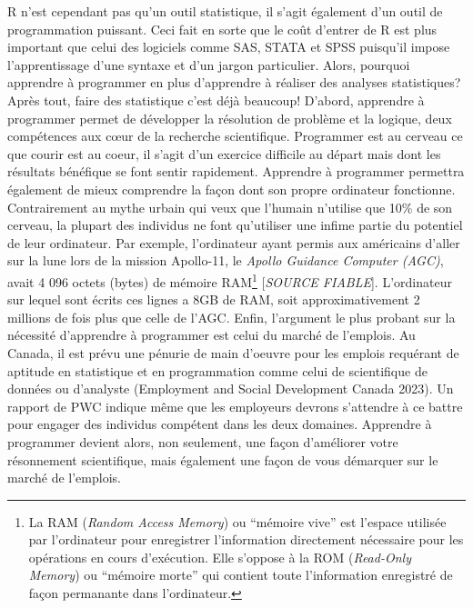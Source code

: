 \documentclass[
  letterpaper,
]{scrbook}
\begin{document}
R n'est cependant pas qu'un outil statistique, il s'agit également d'un
outil de programmation puissant. Ceci fait en sorte que le coût d'entrer
de R est plus important que celui des logiciels comme SAS, STATA et SPSS
puisqu'il impose l'apprentissage d'une syntaxe et d'un jargon
particulier. Alors, pourquoi apprendre à programmer en plus d'apprendre
à réaliser des analyses statistiques? Après tout, faire des statistique
c'est déjà beaucoup! D'abord, apprendre à programmer permet de
développer la résolution de problème et la logique, deux compétences aux
cœur de la recherche scientifique. Programmer est au cerveau ce que
courir est au coeur, il s'agit d'un exercice difficile au départ mais
dont les résultats bénéfique se font sentir rapidement. Apprendre à
programmer permettra également de mieux comprendre la façon dont son
propre ordinateur fonctionne. Contrairement au mythe urbain qui veux que
l'humain n'utilise que 10\% de son cerveau, la plupart des individus ne
font qu'utiliser une infime partie du potentiel de leur ordinateur. Par
exemple, l'ordinateur ayant permis aux américains d'aller sur la lune
lors de la mission Apollo-11, le \emph{Apollo Guidance Computer (AGC)},
avait 4 096 octets (bytes) de mémoire RAM\footnote{La RAM (\emph{Random
  Access Memory}) ou ``mémoire vive'' est l'espace utilisée par
  l'ordinateur pour enregistrer l'information directement nécessaire
  pour les opérations en cours d'exécution. Elle s'oppose à la ROM
  (\emph{Read-Only Memory}) ou ``mémoire morte'' qui contient toute
  l'information enregistré de façon permanante dans l'ordinateur.}
{[}\emph{SOURCE FIABLE}{]}. L'ordinateur sur lequel sont écrits ces
lignes a 8GB de RAM, soit approximativement 2 millions de fois plus que
celle de l'AGC. Enfin, l'argument le plus probant sur la nécessité
d'apprendre à programmer est celui du marché de l'emplois. Au Canada, il
est prévu une pénurie de main d'oeuvre pour les emplois requérant de
aptitude en statistique et en programmation comme celui de scientifique
de données ou d'analyste (Employment and Social Development Canada
2023). Un rapport de PWC indique même que les employeurs devrons
s'attendre à ce battre pour engager des individus compétent dans les
deux domaines. Apprendre à programmer devient alors, non seulement, une
façon d'améliorer votre résonnement scientifique, mais également une
façon de vous démarquer sur le marché de l'emplois.
\end{document}
